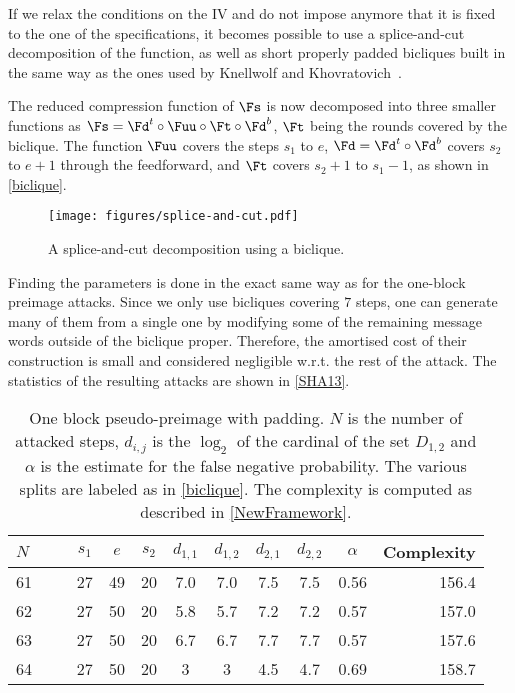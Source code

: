   If we relax the conditions on the IV and do not impose anymore that it is fixed
  to the one of the specifications, it becomes possible to use a splice-and-cut
  decomposition of the function, as well as short properly padded bicliques built in the
  same way as the ones used by Knellwolf and Khovratovich~\cite{DBLP:conf/crypto/KnellwolfK12}.

  The reduced compression function of \shaone $\Fs$ is now decomposed into three smaller
  functions as $\Fs = \Fd^t \circ \Fuu \circ \Ft \circ \Fd^b$, $\Ft$ being the rounds covered by the
  biclique. The function $\Fuu$ covers the steps $s_1$ to $e$, $\Fd = \Fd^t \circ \Fd^b$ covers
  $s_2$ to $e + 1$ through the feedforward, and $\Ft$ covers $s_2 + 1$ to $s_1 - 1$, as shown in
  \autoref{biclique}.

    \begin{figure}
	\center
      \texttt{[image: figures/splice-and-cut.pdf]}
      \caption{A splice-and-cut decomposition using a biclique.\label{biclique}}
    \end{figure}

    Finding the parameters is done in the exact same way as for the one-block preimage attacks.
    Since we only use bicliques covering $7$ steps, one can generate many of them
    from a single one by modifying some of the remaining message words outside of the biclique proper.
    Therefore, the amortised cost of their construction is small and considered negligible w.r.t. the
    rest of the attack. The statistics of the resulting attacks are shown in \autoref{SHA13}.

  \begin{table}[htb]
    \caption[One block pseudo-preimage with padding.]{One block pseudo-preimage with padding. $N$ is the 
              number of attacked steps, $d_{i,j}$ is the $\log_2$ of the cardinal
              of the set $D_{1,2}$ and $\alpha$ is the estimate for the false negative probability.
              The various splits are labeled as in \autoref{biclique}.
            The complexity is computed as described in \autoref{NewFramework}.\label{SHA13}}
    \begin{center}
      \begin{tabular}{l c c c c c  c c c r @{}} \toprule
        $N\qquad$ & $s_1$ & $e$ & $s_2$ & $d_{1,1}$ &  $d_{1,2}$ & $d_{2,1}$ & $d_{2,2}$ & $\alpha $ & Complexity \\\midrule
        61    & 27 & 49 & 20   & 7.0  & 7.0 & 7.5 & 7.5  & 0.56  & 156.4\\ 
        62    & 27 & 50 & 20   & 5.8  & 5.7 & 7.2 & 7.2  & 0.57  & 157.0\\ 
        63    & 27 & 50 & 20   & 6.7  & 6.7 & 7.7 & 7.7  & 0.57  & 157.6\\ 
        64    & 27 & 50 & 20   & 3 & 3 & 4.5 & 4.7  & 0.69  & 158.7\\ 
        \bottomrule
        \hline
      \end{tabular}
    \end{center}
  \end{table}

